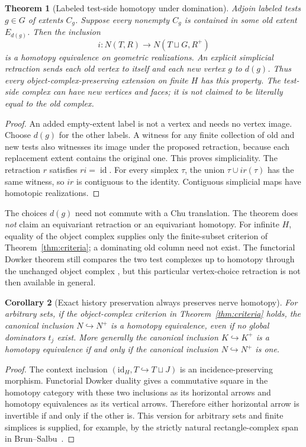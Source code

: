 \documentclass[11pt]{article}
\newtheorem{theorem}{Theorem}[section]
\newtheorem{corollary}[theorem]{Corollary}
\theoremstyle{definition}
\newcommand{\id}{\operatorname{id}}
\begin{document}
\begin{theorem}[Labeled test-side homotopy under domination]\label{thm:testnerve}
Adjoin labeled tests $g\in G$ of extents $C_g$. Suppose every nonempty
$C_g$ is contained in some old extent $E_{d(g)}$. Then the inclusion
\[
 i:N(T,R)\longrightarrow N(T\sqcup G,R^+)
\]
is a homotopy equivalence on geometric realizations. An explicit simplicial
retraction sends each old vertex to itself and each new vertex $g$ to
$d(g)$. Thus every object-complex-preserving extension on finite $H$
has this property. The test-side complex can have new vertices and faces;
it is not claimed to be literally equal to the old complex.
\end{theorem}
\begin{proof}
An added empty-extent label is not a vertex and needs no vertex image.
Choose $d(g)$ for the other labels. A witness for any finite collection of
old and new tests also witnesses its image under the proposed retraction,
because each replacement extent contains the original one. This proves
simpliciality. The retraction $r$ satisfies $ri=\id$. For every simplex
$\tau$, the union $\tau\cup ir(\tau)$ has the same witness, so $ir$ is
contiguous to the identity. Contiguous simplicial maps have homotopic
realizations.
\end{proof}

The choices $d(g)$ need not commute with a Chu translation. The theorem
does \emph{not} claim an equivariant retraction or an equivariant homotopy.
For infinite $H$, equality of the object complex supplies only the
finite-subset criterion of Theorem~\ref{thm:criteria}; a dominating old
column need not exist. The functorial Dowker theorem still compares the
two test complexes up to homotopy through the unchanged object complex
\cite{BrunSalbu}, but this particular vertex-choice retraction is not then
available in general.


\begin{corollary}[Exact history preservation always preserves nerve homotopy]
\label{gt:general-homotopy}
For arbitrary sets, if the object-complex criterion in Theorem~\ref{thm:criteria} holds, the
canonical inclusion $N\hookrightarrow N^+$ is a homotopy equivalence,
even if no global dominators $t_j$ exist. More generally the canonical
inclusion $K\hookrightarrow K^+$ is a homotopy equivalence if and only if
the canonical inclusion $N\hookrightarrow N^+$ is one.
\end{corollary}
\begin{proof}
The context inclusion $(\mathrm{id}_H,T\hookrightarrow T\sqcup J)$ is
an incidence-preserving morphism. Functorial Dowker duality gives a
commutative square in the homotopy category with these two inclusions
as its horizontal arrows and homotopy equivalences as its vertical
arrows. Therefore either horizontal arrow is invertible if and only
if the other is. This version for arbitrary sets and finite simplices
is supplied, for example, by the strictly natural rectangle-complex
span in Brun--Salbu~\cite[Theorems 5.1--5.2]{BrunSalbu}.
\end{proof}
\end{document}
